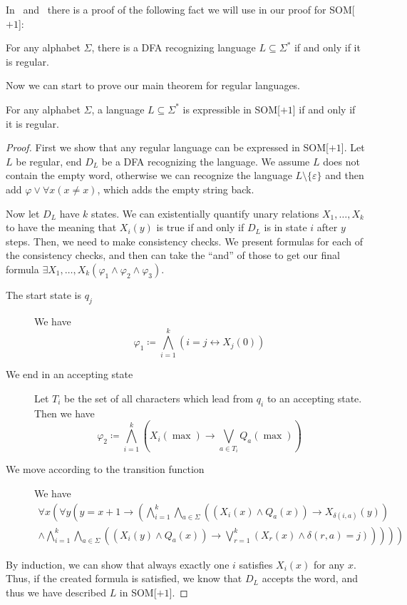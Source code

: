 In~\cite{theory-cs} and~\cite{Straubing1994} there is a proof of the following fact we will use in our proof for SOM[$+1$]:
\begin{theorem}
    For any alphabet $\Sigma$, there is a DFA recognizing language $L \subseteq \Sigma^{*}$ if and only if it is regular.
\end{theorem}

Now we can start to prove our main theorem for regular languages.
\begin{theorem}
    For any alphabet $\Sigma$, a language $L \subseteq \Sigma^{*}$ is expressible in SOM[$+1$] if and only if it is regular.
\end{theorem}

\begin{proof}
    First we show that any regular language can be expressed in SOM[$+1$].
    Let $L$ be regular, end $D_L$ be a DFA recognizing the language.
    We assume $L$ does not contain the empty word, otherwise we can recognize the language $L \setminus \{\varepsilon\}$ and then add $\varphi \lor \forall x(x \neq x)$, which adds the empty string back.

    Now let $D_L$ have $k$ states.
    We can existentially quantify unary relations $X_1, \dots, X_k$ to have the meaning that $X_i(y)$ is true if and only if $D_L$ is in state $i$ after $y$ steps.
    Then, we need to make consistency checks.
    We present formulas for each of the consistency checks, and then can take the ``and'' of those to get our final formula $\exists X_1, \dots, X_k(\varphi_1 \land \varphi_2 \land \varphi_3)$.
    \begin{description}
        \item[The start state is $q_j$] We have \[\varphi_1 \coloneqq \bigwedge_{i = 1}^{k} (i = j \leftrightarrow X_j(0))\]
        \item[We end in an accepting state] Let $T_i$ be the set of all characters which lead from $q_i$ to an accepting state.
        Then we have
        \[
            \varphi_2 \coloneqq \bigwedge_{i = 1}^{k}\left(X_i(\max) \to \bigvee_{a \in T_i} Q_a(\max)\right)
        \]
        \item[We move according to the transition function] We have
        \begin{align*}
            \forall x\left( \forall y \left( y = x + 1 \to \left(\bigwedge_{i = 1}^{k} \bigwedge_{a \in \Sigma} \left(\left(X_i(x) \land Q_a(x)\right) \to X_{\delta(i, a)}(y)\right) \right. \right. \right. \\
            \left. \left. \left.\land \bigwedge_{i = 1}^{k}\bigwedge_{a \in \Sigma} \left(\left(X_i(y) \land Q_a(x)\right) \to \bigvee_{r = 1}^{k}\left(X_r(x) \land \delta(r, a) = j\right)\right)  \right)  \right) \right)
        \end{align*}
    \end{description}
    By induction, we can show that always exactly one $i$ satisfies $X_i(x)$ for any $x$.
    Thus, if the created formula is satisfied, we know that $D_L$ accepts the word, and thus we have described $L$ in SOM[$+1$].


\end{proof}
